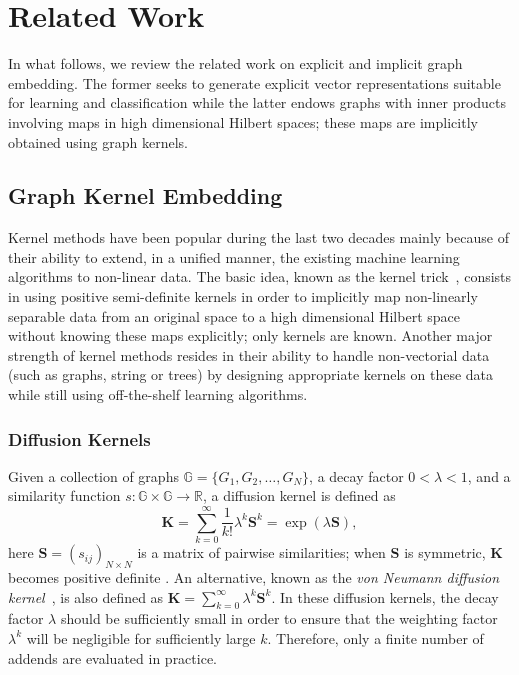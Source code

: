 \documentclass[journal]{IEEEtran}
\theoremstyle{definition}
\begin{document}
\section{Related Work}
\label{sec:relwrks}

In what follows, we review the related work on explicit and implicit graph embedding. The former seeks to generate explicit vector representations suitable for learning and classification while the latter endows graphs with inner products involving maps in high dimensional Hilbert spaces; these maps are implicitly obtained using graph kernels. 
 
\subsection{Graph Kernel Embedding}

Kernel methods have been popular during the last two decades mainly because of their ability to extend, in a unified manner, the existing machine learning algorithms to non-linear data. The basic idea, known as the kernel trick~\cite{Vapnik1998}, consists in using positive semi-definite kernels in order to implicitly map non-linearly separable data from an original space to a high dimensional Hilbert space without knowing these maps explicitly; only kernels are known. Another major strength of kernel methods resides in their ability to handle non-vectorial data (such as graphs, string or trees) by designing appropriate kernels on these data while still using off-the-shelf learning algorithms.

\subsubsection{Diffusion Kernels}
Given a collection of graphs $\mathbb{G} = \lbrace G_1, G_2, \dots, G_N\rbrace$, a decay factor $0 < \lambda < 1$, and a similarity function $s: \mathbb{G}\times\mathbb{G} \rightarrow \mathbb{R}$, a diffusion kernel \cite{Lafferty2005} is defined as 
\begin{equation*}
\mathbf{K} = \sum_{k=0}^{\infty} \frac{1}{k!}\lambda^k\mathbf{S}^k = \exp(\lambda\mathbf{S}),
\end{equation*}
here $\mathbf{S}=(s_{ij})_{N\times N}$ is a matrix of pairwise similarities; when $\mathbf{S}$ is symmetric, $\mathbf{K}$ becomes positive definite \cite{Smola2003}. An alternative, known as the \emph{von Neumann diffusion kernel}~\cite{Kandola2002}, is also defined as $\mathbf{K} = \sum_{k=0}^{\infty} \lambda^k\mathbf{S}^k$. In these diffusion kernels, the decay factor $\lambda$ should be sufficiently small in order to ensure that the weighting factor $\lambda^k$ will be negligible for sufficiently large $k$. Therefore, only a finite number of addends are evaluated in practice. 
\end{document}
